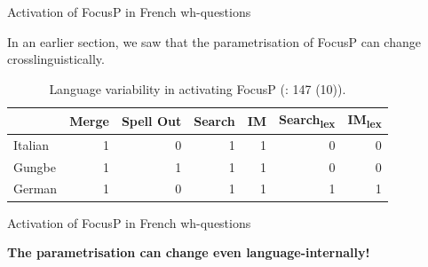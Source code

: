 \documentclass[lesson_slides]{subfiles}
\begin{document}
\begin{frame}[c]{Activation of FocusP in French wh-questions}

    In an earlier section, we saw that the parametrisation of FocusP can change crosslinguistically. \pause

    \begin{table}[H]
    \centering
        \begin{tabular}{|l|r|r|r|r|r|r|}
        \hline
         & Merge & Spell Out & Search & IM & Search\textsubscript{lex} & IM\textsubscript{lex} \\
        \hline
        Italian & 1 & 0 & 1 & 1 & 0 & 0 \\
        \hline
        Gungbe & 1 & 1 & 1 & 1 & 0 & 0 \\
        \hline
        German & 1 & 0 & 1 & 1 & 1 & 1 \\
        \hline
        \end{tabular}
    \caption{\label{tab:samp}Language variability in activating FocusP (\cite{samo2019cartography}: 147 (10)).}
    \end{table}

\end{frame}
\begin{frame}[c]{Activation of FocusP in French wh-questions}

\begin{center}
    \bf{The parametrisation can change even language-internally!}
\end{center}

\end{frame}
\end{document}
